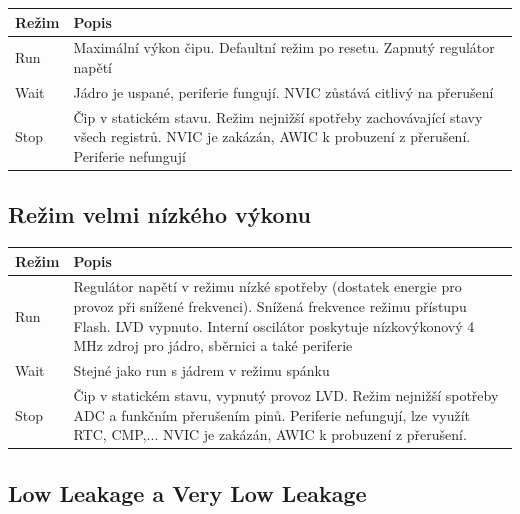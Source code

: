 \documentclass{article}
\begin{document}
\begin{tabularx}{\textwidth}{|>{\centering\arraybackslash}p{}|X|}
    \hline
    \textbf{Režim} & \textbf{Popis} \\
    \hline
    Run & Maximální výkon čipu. Defaultní režim po resetu. Zapnutý regulátor
    napětí \\
    \hline
    Wait & Jádro je uspané, periferie fungují. NVIC zůstává citlivý na
    přerušení \\
    \hline
    Stop & Čip v statickém stavu. Režim nejnižší spotřeby zachovávající stavy
    všech registrů. NVIC je zakázán, AWIC k probuzení z přerušení. Periferie
    nefungují \\
    \hline
\end{tabularx}

\subsection{Režim velmi nízkého výkonu}

\begin{tabularx}{\textwidth}{|>{\centering\arraybackslash}p{}|X|}
    \hline
    \textbf{Režim} & \textbf{Popis} \\
    \hline
    Run & Regulátor napětí v režimu nízké spotřeby (dostatek energie pro
    provoz při snížené frekvenci). Snížená frekvence režimu přístupu Flash.
    LVD vypnuto. Interní oscilátor poskytuje nízkovýkonový 4 MHz zdroj pro
    jádro, sběrnici a také periferie \\
    \hline
    Wait & Stejné jako run s jádrem v režimu spánku \\
    \hline
    Stop & Čip v statickém stavu, vypnutý provoz LVD. Režim nejnižší spotřeby
    ADC a funkčním přerušením pinů. Periferie nefungují, lze využít RTC,
    CMP,... NVIC je zakázán, AWIC k probuzení z přerušení. \\
    \hline
\end{tabularx}

\subsection{Low Leakage a Very Low Leakage}
\end{document}
